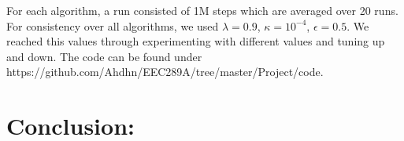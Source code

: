 \documentclass[a4paper,10pt]{article}
\def\url#1{\expandafter\string\csname #1\endcsname}
\begin{document}
For each algorithm, a run consisted of 1M steps which are averaged over 20 runs. For consistency over all algorithms, we used $\lambda=0.9$, $\kappa=10^{-4}$, $\epsilon=0.5$. We reached this values through experimenting with different values and tuning up and down. The code can be found under \\
\url{https://github.com/Ahdhn/EEC289A/tree/master/Project/code}. 

\section{Conclusion:}

   
   
 
\medskip


\end{document}
